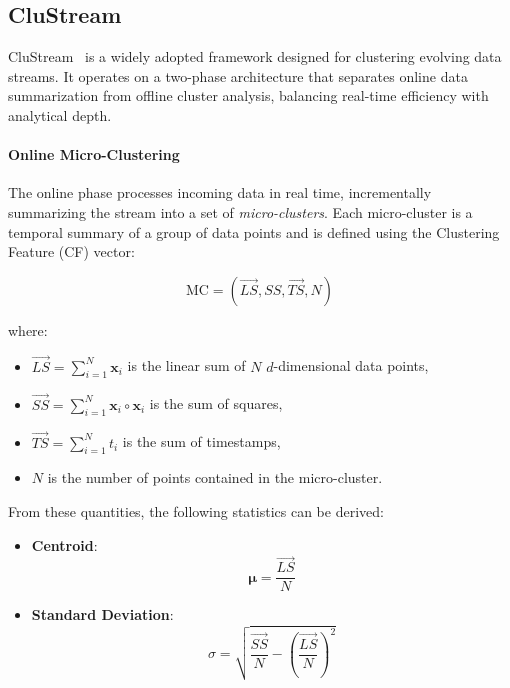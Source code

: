 \subsection{CluStream}\label{subsec:clustream}

CluStream~\cite{clustream} is a widely adopted framework designed for
clustering evolving data streams. It operates on a two-phase architecture that
separates online data summarization from offline cluster analysis, balancing
real-time efficiency with analytical depth.

\paragraph{Online Micro-Clustering} The online phase processes incoming data in real time, incrementally
summarizing the stream into a set of \emph{micro-clusters}. Each micro-cluster
is a temporal summary of a group of data points and is defined using the
Clustering Feature (CF) vector:

\begin{equation}
    \text{MC} = \left( \vec{LS}, SS, \vec{TS}, N \right)
\end{equation}

where:
\begin{itemize}
    \item $\vec{LS} = \sum_{i=1}^{N} \mathbf{x}_i$ is the linear sum of $N$ $d$-dimensional data points,
    \item $\vec{SS} = \sum_{i=1}^{N} \mathbf{x}_i \circ \mathbf{x}_i$ is the sum of squares,
    \item $\vec{TS} = \sum_{i=1}^{N} t_i$ is the sum of timestamps,
    \item $N$ is the number of points contained in the micro-cluster.
\end{itemize}

From these quantities, the following statistics can be derived:
\begin{itemize}
    \item \textbf{Centroid}:
          \begin{equation}
              \boldsymbol{\mu} = \frac{\vec{LS}}{N}
          \end{equation}
    \item \textbf{Standard Deviation}:
          \begin{equation}
              \sigma = \sqrt{ \frac{\vec{SS}}{N} - \left( \frac{\vec{LS}}{N} \right)^2 }
          \end{equation}
\end{itemize}

